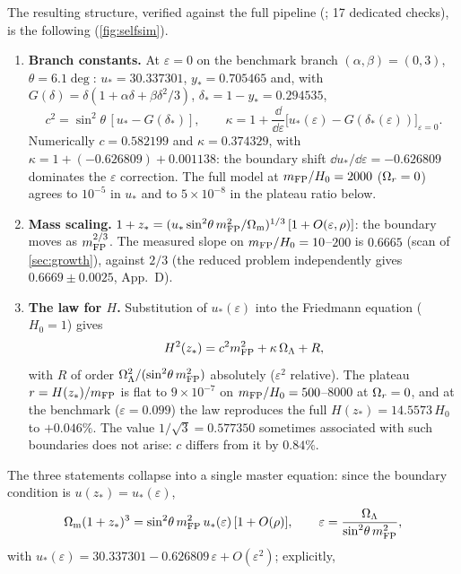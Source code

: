 The resulting structure, verified against the full pipeline (; 17 dedicated checks), is the following (\cref{fig:selfsim}).
\begin{enumerate}
\item \textbf{Branch constants.} At $\varepsilon=0$ on the benchmark branch $(\alpha,\beta)=(0,3)$, $\theta=6.1\deg$: $u_*=30.337301$, $y_*=0.705465$ and, with $G(\delta)=\delta(1+\alpha\delta+\beta\delta^2/3)$, $\delta_*=1-y_*=0.294535$,
\begin{equation}
c^2=\sin^2\!\theta\,[u_*-G(\delta_*)],\qquad
\kappa=1+\frac{\dd}{\dd\varepsilon}\bigl[u_*(\varepsilon)-G(\delta_*(\varepsilon))\bigr]_{\varepsilon=0}.
\end{equation}
Numerically $c=0.582199$ and $\kappa=0.374329$, with $\kappa=1+(-0.626809)+0.001138$: the boundary shift $\dd u_*/\dd\varepsilon=-0.626809$ dominates the $\varepsilon$ correction. The full model at $m_{\mathrm{FP}}/H_0=2000$ ($\Omega_{r}=0$) agrees to $10^{-5}$ in $u_*$ and to $5\times10^{-8}$ in the plateau ratio below.
\item \textbf{Mass scaling.} $1+z_*=(u_*\sin^2\!\theta\,m_{\mathrm{FP}}^2/\Omega_{\mathrm m})^{1/3}\,[1+O(\varepsilon,\rho)]$: the boundary moves as $m_{\mathrm{FP}}^{2/3}$. The measured slope on $m_{\mathrm{FP}}/H_0=10$--$200$ is $0.6665$ (scan of \cref{sec:growth}), against $2/3$ (the reduced problem independently gives $0.6669\pm0.0025$, App.~D).
\item \textbf{The law for $H$.} Substitution of $u_*(\varepsilon)$ into the Friedmann equation ($H_0=1$) gives
\begin{equation}
H^2(z_*)=c^2m_{\mathrm{FP}}^2+\kappa\,\Omega_{\Lambda}+R,\label{eq:Hlaw}
\end{equation}
with $R$ of order $\Omega_{\Lambda}^2/(\sin^2\!\theta\,m_{\mathrm{FP}}^2)$ absolutely ($\varepsilon^2$ relative). The plateau $r=H(z_*)/m_{\mathrm{FP}}$ is flat to $9\times10^{-7}$ on $m_{\mathrm{FP}}/H_0=500$--$8000$ at $\Omega_{r}=0$, and at the benchmark ($\varepsilon=0.099$) the law reproduces the full $H(z_*)=14.5573\,H_0$ to $+0.046\%$. The value $1/\sqrt3=0.577350$ sometimes associated with such boundaries does not arise: $c$ differs from it by $0.84\%$.
\end{enumerate}
The three statements collapse into a single master equation: since the boundary condition is $u(z_*)=u_*(\varepsilon)$,
\begin{equation}
\Omega_{\mathrm m}(1+z_*)^3=\sin^2\!\theta\,m_{\mathrm{FP}}^2\,u_*(\varepsilon)\,[1+O(\rho)],\qquad
\varepsilon=\frac{\Omega_{\Lambda}}{\sin^2\!\theta\,m_{\mathrm{FP}}^2},\label{eq:master}
\end{equation}
with $u_*(\varepsilon)=30.337301-0.626809\,\varepsilon+O(\varepsilon^2)$; explicitly,
